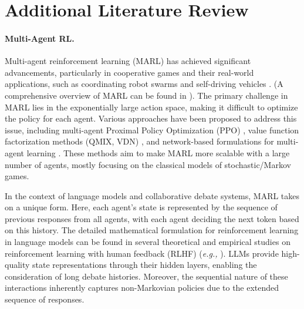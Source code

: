 
\section{Additional Literature Review}
\label{appendix:deferred_literature}
\paragraph{Multi-Agent RL. }
Multi-agent reinforcement learning (MARL) has achieved significant advancements, particularly in cooperative games and their real-world applications, such as coordinating robot swarms \citep{huttenrauch2017guided} and self-driving vehicles \citep{shalev2016safe}. (A comprehensive overview of MARL can be found in \citet{zhang2021multi}).  The primary challenge in MARL lies in the exponentially large action space, making it difficult to optimize the policy for each agent. Various approaches have been proposed to address this issue, including multi-agent Proximal Policy Optimization (PPO) \citep{yu2022surprising}, value function factorization methods (QMIX, VDN) \citep{rashid2020monotonic, sunehag2017value}, and network-based formulations for multi-agent learning \citep{park2024multi}. These methods aim to make MARL more scalable with a large number of agents, mostly focusing on the classical models of stochastic/Markov games. 


In the context of language models and collaborative debate systems, MARL takes on a unique form. Here, each agent's state is represented by the sequence of previous responses from all agents, with each agent deciding the next token based on this history. The detailed mathematical formulation for reinforcement learning in language models can be found in several theoretical and empirical studies on reinforcement learning with human feedback (RLHF) (\textit{e.g.,} \citet{ouyang2022training, zhu2023principled, park2024principled}). LLMs provide high-quality state representations through their hidden layers, enabling the consideration of long debate histories. Moreover, the sequential nature of these interactions inherently captures non-Markovian policies due to the extended sequence of responses. 

